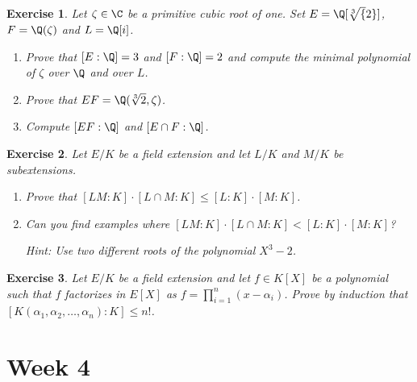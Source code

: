\documentclass[a4paper,10pt,reqno]{amsart}
\newtheorem{ex}{Exercise}[section]
\begin{document}
\begin{ex}
\label{3.4}
Let $\zeta\in\C$ be a primitive cubic root of one.
Set $E=\Q[\sqrt[3]{2}]$, $F=\Q(\zeta)$ and $L=\Q[i]$.
\begin{enumerate}[label=(\roman*)]
    \item Prove that $[E:\Q]=3$ and $[F:\Q]=2$ and compute the minimal polynomial of $\zeta$ over $\Q$ and over $L$.
    \item Prove that $EF=\Q(\sqrt[3]{2},\zeta)$.
    \item Compute $[EF:\Q]$ and $[E\cap F:\Q]$.
\end{enumerate}  
\end{ex}

\begin{ex}
\label{3.5}
    Let $E/K$ be a field extension and let $L/K$ and $M/K$ be subextensions.
    \begin{enumerate}[label=(\roman*)]
    \item Prove that $[LM : K ] \cdot [L \cap M : K] \leq [L:K] \cdot [M:K]$.
    \item Can you find examples where $[LM : K ] \cdot [L \cap M : K] < [L:K] \cdot [M:K]$?
    
    \noindent \textit{Hint:} Use two different roots of the polynomial $X^3 -2$.
    \end{enumerate}  
\end{ex}

\begin{ex}
\label{3.6}
    Let $E/K$ be a field extension and let $f \in K[X]$ be a polynomial such that $f$ factorizes in $E[X]$ as $f = \prod_{i=1}^n(x - \alpha_i)$. Prove by induction that $[K(\alpha_1,\alpha_2, \ldots, \alpha_n):K] \leq n!$.
\end{ex}

\newpage
\section{Week 4}
\end{document}
